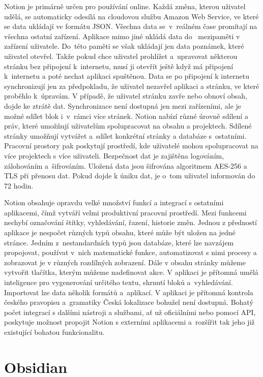 \documentclass[czech, bc, kiv, he, iso690numb]{fasthesis}
\begin{document}
Notion je primárně určen pro používání online. Každá změna, kterou uživatel udělá, se automaticky odesílá na cloudovou službu Amazon Web Service, ve které se data ukládají ve formátu \gls{JSON}. Všechna data se~v~reálném čase promítají na všechna ostatní zařízení. Aplikace mimo jiné ukládá data do~ mezipaměti v zařízení uživatele. Do~této paměti se však ukládají jen data poznámek, které uživatel otevřel. Takže pokud chce uživatel prohlížet a~upravovat některou stránku bez připojení k~internetu, musí ji otevřít ještě když má připojení k~internetu a poté nechat aplikaci spuštěnou. Data se po připojení k internetu synchronizují jen za předpokladu, že uživatel nezavřel aplikaci a stránku, ve které proběhlo k~úpravám. V případě, že uživatel stránku zavře nebo obnoví obsah, dojde ke ztrátě dat. Synchronizace není dostupná jen mezi zařízeními, ale je možné sdílet blok i~v~rámci více stránek. Notion nabízí různé úrovně sdílení a práv, které umožňují uživatelům spolupracovat na obsahu a projektech. Sdílené stránky umožňují vytvářet a~sdílet konkrétní stránky a databáze s~ostatními. Pracovní prostory pak poskytují prostředí, kde uživatelé mohou spolupracovat na více projektech s více uživateli. Bezpečnost dat je zajištěna logováním, zálohováním a~šifrováním. Uložená data jsou šifrována algoritmem \gls{AES}-256 a \gls{TLS} při přenosu dat. Pokud dojde k úniku dat, je o~tom uživatel informován do 72 hodin.       

Notion obsahuje opravdu velké množství funkcí a integrací s ostatními aplikacemi, čímž vytváří velmi produktivní pracovní prostředí. Mezi funkcemi nechybí označování štítky, vyhledávání, řazení, historie změn. Jednou z předností aplikace je nespočet různých typů obsahu, které může být uložen na jedné stránce. Jedním z~nestandardních typů jsou databáze, které lze navzájem propojovat, používat v~nich matematické funkce, automatizovat s nimi procesy a zobrazovat je v různých rozdílných zobrazení. Dále v obsahu stránky můžeme vytvořit tlačítka, kterým můžeme nadefinovat akce. V aplikaci je přítomná umělá inteligence pro vygenerování určitého textu, shrnutí bloků a~vyhledávání. Importovat lze data několik formátů a~aplikací. V aplikaci je přítomná kontrola českého pravopisu a~gramatiky Česká lokalizace bohužel není dostupná. Bohatý počet integrací s dalšími nástroji a službami, ať už oficiálními nebo pomocí \gls{API}, poskytuje možnost propojit Notion s externími aplikacemi a~rozšířit tak jeho již existující bohatou funkcionalitu. 

\section{Obsidian}
\end{document}
